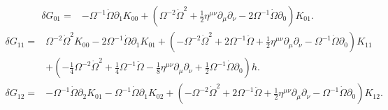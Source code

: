 \documentclass[10pt,letterpaper]{article}
\begin{document}
\begin{align}
\delta G_{01}={}&- \Omega^{-1} \dot{\Omega} \partial_{1} K_{00}
 + (\Omega^{-2} \dot{\Omega}^2
 + \tfrac{1}{2} \eta^{\mu \nu} \partial_{\mu} \partial_{\nu}
 - 2 \Omega^{-1} \dot{\Omega} \partial_{0}) K_{01}.
\end{align}
\begin{align}
\delta G_{11}={}&\Omega^{-2} \dot{\Omega}^2 K_{00}
 - 2 \Omega^{-1} \dot{\Omega} \partial_{1} K_{01}
 + (- \Omega^{-2} \dot{\Omega}^2
 + 2 \Omega^{-1} \ddot{\Omega}
 + \tfrac{1}{2} \eta^{\mu \nu} \partial_{\mu} \partial_{\nu}
 -  \Omega^{-1} \dot{\Omega} \partial_{0}) K_{11}\nonumber\\
& + (- \tfrac{1}{4} \Omega^{-2} \dot{\Omega}^2
 + \tfrac{1}{4} \Omega^{-1} \ddot{\Omega}
 -  \tfrac{1}{8} \eta^{\mu \nu} \partial_{\mu} \partial_{\nu}
 + \tfrac{1}{2} \Omega^{-1} \dot{\Omega} \partial_{0}) h.
\end{align}
\begin{align}
\delta G_{12}={}&- \Omega^{-1} \dot{\Omega} \partial_{2} K_{01}
 -  \Omega^{-1} \dot{\Omega} \partial_{1} K_{02}
 + (- \Omega^{-2} \dot{\Omega}^2
 + 2 \Omega^{-1} \ddot{\Omega}
 + \tfrac{1}{2} \eta^{\mu \nu} \partial_{\mu} \partial_{\nu}
 -  \Omega^{-1} \dot{\Omega} \partial_{0}) K_{12}.
\end{align}
\end{document}
